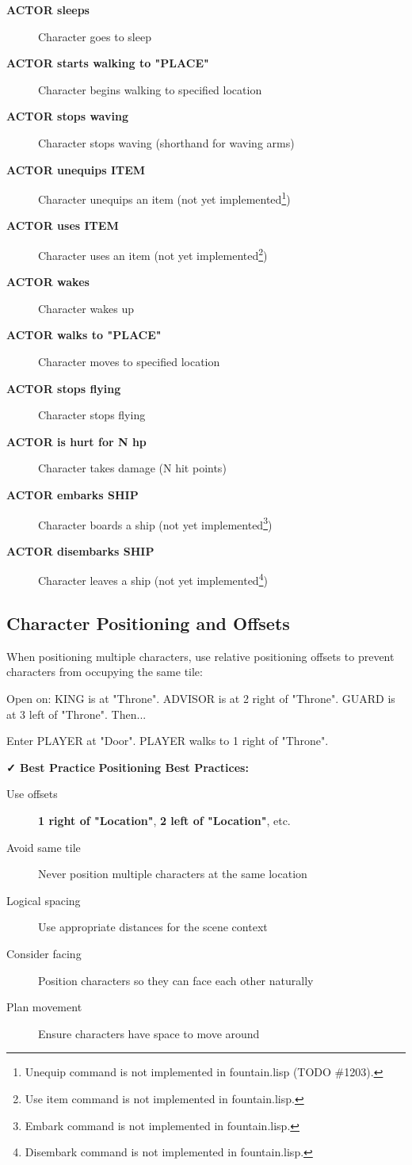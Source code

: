 \documentclass[11pt,letterpaper,oldstylefigures]{memoir}
\newcommand{\stagedir}[1]{#1\par\vspace{1\baselineskip}}
\newenvironment{FountainExample}
  {\begingroup
  \ttfamily\small
   \setlength{\parindent}{0pt}
  \setlength{\parskip}{0.5em}
  \allowdisplaybreaks
  \setlength{\displaywidowpenalty}{0}
  \setlength{\widowpenalty}{0}
  \setlength{\clubpenalty}{0}
  \setlength{\interlinepenalty}{0}
}
  {\endgroup}
\newcommand{\fountain}[1]{\textbf{#1}}
\begin{document}
\begin{FountainExample}
\begin{description}
\item[\fountain{ACTOR sleeps}] Character goes to sleep
\item[\fountain{ACTOR starts walking to "PLACE"}] Character begins walking to specified location
\item[\fountain{ACTOR stops waving}] Character stops waving (shorthand for waving arms)
\item[\fountain{ACTOR unequips ITEM}] Character unequips an item (not yet implemented\footnote{Unequip command is not implemented in fountain.lisp (TODO \#1203).})
\item[\fountain{ACTOR uses ITEM}] Character uses an item (not yet implemented\footnote{Use item command is not implemented in fountain.lisp.})
\item[\fountain{ACTOR wakes}] Character wakes up
\item[\fountain{ACTOR walks to "PLACE"}] Character moves to specified location
\item[\fountain{ACTOR stops flying}] Character stops flying
\item[\fountain{ACTOR is hurt for N hp}] Character takes damage (N hit points)
\item[\fountain{ACTOR embarks SHIP}] Character boards a ship (not yet implemented\footnote{Embark command is not implemented in fountain.lisp.})
\item[\fountain{ACTOR disembarks SHIP}] Character leaves a ship (not yet implemented\footnote{Disembark command is not implemented in fountain.lisp.})
\end{description}

\subsection{Character Positioning and Offsets}

When positioning multiple characters, use relative positioning offsets to prevent characters from occupying the same tile:

\begin{FountainExample}
\stagedir{Open on: KING is at "Throne". ADVISOR is at 2 right of "Throne". GUARD is at 3 left of "Throne". Then...}
\stagedir{Enter PLAYER at "Door". PLAYER walks to 1 right of "Throne".}
\end{FountainExample}

\textbf{✓ Best Practice}
\textbf{Positioning Best Practices:}
\begin{description}
\item[Use offsets] \fountain{1 right of "Location"}, \fountain{2 left of "Location"}, etc.
\item[Avoid same tile] Never position multiple characters at the same location
\item[Logical spacing] Use appropriate distances for the scene context
\item[Consider facing] Position characters so they can face each other naturally
\item[Plan movement] Ensure characters have space to move around
\end{description}



\end{FountainExample}
\end{document}
